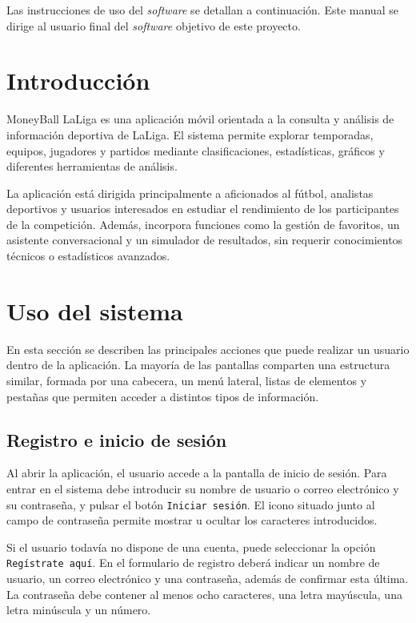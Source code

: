 Las instrucciones de uso del \textit{software} se detallan a continuación. Este manual se dirige al usuario final del \textit{software} objetivo de este proyecto.

\section{Introducción}

MoneyBall LaLiga es una aplicación móvil orientada a la consulta y análisis de información deportiva de LaLiga. El sistema permite explorar temporadas, equipos, jugadores y partidos mediante clasificaciones, estadísticas, gráficos y diferentes herramientas de análisis.

La aplicación está dirigida principalmente a aficionados al fútbol, analistas deportivos y usuarios interesados en estudiar el rendimiento de los participantes de la competición. Además, incorpora funciones como la gestión de favoritos, un asistente conversacional y un simulador de resultados, sin requerir conocimientos técnicos o estadísticos avanzados.

\section{Uso del sistema}

En esta sección se describen las principales acciones que puede realizar un usuario dentro de la aplicación. La mayoría de las pantallas comparten una estructura similar, formada por una cabecera, un menú lateral, listas de elementos y pestañas que permiten acceder a distintos tipos de información.

\subsection{Registro e inicio de sesión}

Al abrir la aplicación, el usuario accede a la pantalla de inicio de sesión. Para entrar en el sistema debe introducir su nombre de usuario o correo electrónico y su contraseña, y pulsar el botón \texttt{Iniciar sesión}. El icono situado junto al campo de contraseña permite mostrar u ocultar los caracteres introducidos.

Si el usuario todavía no dispone de una cuenta, puede seleccionar la opción \texttt{Regístrate aquí}. En el formulario de registro deberá indicar un nombre de usuario, un correo electrónico y una contraseña, además de confirmar esta última. La contraseña debe contener al menos ocho caracteres, una letra mayúscula, una letra minúscula y un número.

